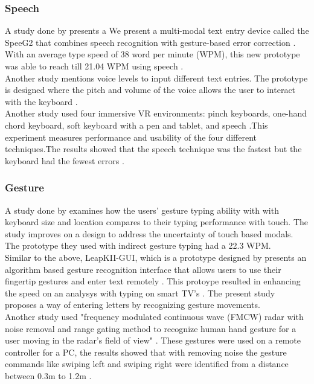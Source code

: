 \documentclass{vgtc}                          %
\begin{document}
\subsubsection{Speech}

A study done by \cite{17} presents a We present a multi-modal text entry device called the SpeeG2 that combines speech recognition with gesture-based error correction \cite{17}. With an average type speed of 38 word per minute (WPM), this new prototype was able to reach till 21.04 WPM using speech \cite{17}.\\[1em]
Another study mentions voice levels to input different text entries. The prototype is designed where the pitch and volume of the voice allows the user to interact with the keyboard \cite{21}.\\[1em]
Another study used four immersive VR environments: pinch keyboards, one-hand chord keyboard, soft keyboard with a pen and tablet, and speech \cite{22}.This experiment measures performance and usability of the four different techniques.The results showed that the speech technique was the fastest but the keyboard had the fewest errors \cite{22}.
\subsubsection{Gesture}
A study done by \cite{33} examines how the users' gesture typing ability with with keyboard size and location compares to their typing performance with touch. The study improves on a design to address the uncertainty of touch based modals. The prototype they used with indirect gesture typing had a 22.3 WPM\cite{33}.\\[1em]
Similar to the above, LeapKII-GUI, which is a prototype designed by \cite{20} presents an algorithm based gesture recognition interface that allows users to use their fingertip gestures and enter text remotely \cite{20}. This protoype resulted in enhancing the speed on an analysys with typing on smart TV's \cite{20}.
The present study proposes a way of entering letters by recognizing gesture movements. \\[1em]
Another study used "frequency modulated continuous wave (FMCW) radar
with noise removal and range gating method to recognize human
hand gesture for a user moving in the radar’s field of view" \cite{39}. These gestures were used on a remote controller for a PC, the results showed that with removing noise the gesture commands like swiping left and swiping right were identified from a distance between 0.3m to 1.2m \cite{39}.
\end{document}
